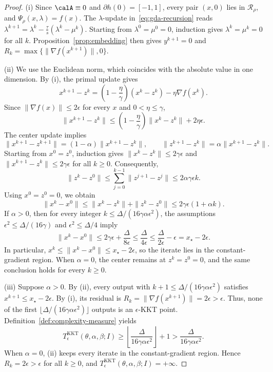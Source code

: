 \begin{proof}
(i) Since \(\calA\equiv0\) and \(\partial h(0)=[-1,1]\), every pair
\((x,0)\) lies in \(\mathcal R_\rho\), and \(\Psi_\rho(x,\lambda)=f(x)\). The
\(\lambda\)-update in~\eqref{eq:gda-recursion} reads
\(\lambda^{k+1}=\lambda^k-\frac{\tau}{s}(\lambda^k-\mu^k)\). Starting from
\(\lambda^0=\mu^0=0\), induction gives \(\lambda^k=\mu^k=0\) for all \(k\).
Proposition~\ref{prop:embedding} then gives \(y^{k+1}=0\) and
\(R_k=\max\{\|\nabla f(x^{k+1})\|,0\}\).

(ii) We use the Euclidean norm, which coincides with the absolute value
in one dimension. By (i), the primal update gives
\[
x^{k+1}-z^k
=\left(1-\frac{\eta}{\gamma}\right)(x^k-z^k)-\eta\nabla f(x^k).
\]
Since \(\|\nabla f(x)\|\le2\epsilon\) for every \(x\) and
\(0<\eta\le\gamma\),
\[
\|x^{k+1}-z^k\|
\le\left(1-\frac{\eta}{\gamma}\right)\|x^k-z^k\|+2\eta\epsilon.
\]
The center update implies
\[
\|x^{k+1}-z^{k+1}\|=(1-\alpha)\|x^{k+1}-z^k\|,
\qquad
\|z^{k+1}-z^k\|=\alpha\|x^{k+1}-z^k\|.
\]
Starting from \(x^0=z^0\), induction gives
\(\|x^k-z^k\|\le2\gamma\epsilon\) and
\(\|x^{k+1}-z^k\|\le2\gamma\epsilon\) for all \(k\ge0\).
Consequently,
\[
\|z^k-z^0\|
\le\sum_{j=0}^{k-1}\|z^{j+1}-z^j\|
\le2\alpha\gamma\epsilon k.
\]
Using \(x^0=z^0=0\), we obtain
\[
\|x^k-x^0\|
\le\|x^k-z^k\|+\|z^k-z^0\|
\le2\gamma\epsilon(1+\alpha k).
\]
If \(\alpha>0\), then for every integer \(k\le\Delta/(16\gamma\alpha\epsilon^2)\), the
assumptions \(\epsilon^2\le\Delta/(16\gamma)\) and
\(\epsilon^2\le\Delta/4\) imply
\[
\|x^k-x^0\|
\le2\gamma\epsilon+\frac{\Delta}{8\epsilon}
\le\frac{\Delta}{4\epsilon}
\le\frac{\Delta}{2\epsilon}-\epsilon
=x_\star-2\epsilon.
\]
In particular, \(x^k\le\|x^k-x^0\|\le x_\star-2\epsilon\), so the
iterate lies in the constant-gradient region. When \(\alpha=0\), the
center remains at \(z^k=z^0=0\), and the same conclusion holds for every
\(k\ge0\).

(iii) Suppose \(\alpha>0\). By (ii), every output with
\(k+1\le\Delta/(16\gamma\alpha\epsilon^2)\) satisfies
\(x^{k+1}\le x_\star-2\epsilon\). By (i), its residual is
\(R_k=\|\nabla f(x^{k+1})\|=2\epsilon>\epsilon\).
Thus, none of the first
\(\lfloor\Delta/(16\gamma\alpha\epsilon^2)\rfloor\) outputs is an
\(\epsilon\)-KKT point. Definition~\ref{def:complexity-measure} yields
\[
T^{\mathrm{KKT}}_\epsilon(\theta,\alpha,\beta;I)
\ge\left\lfloor\frac{\Delta}{16\gamma\alpha\epsilon^2}\right\rfloor+1
>\frac{\Delta}{16\gamma\alpha\epsilon^2}.
\]
When \(\alpha=0\), (ii) keeps every iterate in the constant-gradient region.
Hence \(R_k=2\epsilon>\epsilon\) for all \(k\ge0\), and
\(T^{\mathrm{KKT}}_\epsilon(\theta,\alpha,\beta;I)=+\infty\).
\end{proof}

